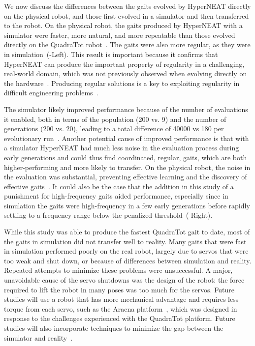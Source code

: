 We now discuss the differences between the gaits evolved by HyperNEAT directly on the physical robot, and those first evolved in a simulator and then transferred to the robot. 
On the physical robot, the gaits produced by HyperNEAT with a simulator were faster, more natural, and more repeatable than those evolved directly on the QuadraTot robot~\cite{yos:clune}. The gaits were also more regular, as they were in simulation~(-Left). This result is important because it confirms that HyperNEAT can produce the important property of
regularity in a challenging, real-world domain, which was not previously observed when
evolving directly on the hardware~\cite{yos:clune}. Producing regular solutions is a key to exploiting regularity in difficult engineering problems~\cite{clune2011performance}. 


The simulator likely improved performance because of the number of evaluations it enabled, both in terms of the population (200 vs. 9) and the number of generations (200 vs. 20), leading
to a total difference of 40000 vs 180 per evolutionary run~\cite{yos:clune}. Another
potential cause of improved performance is that with a simulator
HyperNEAT had much less noise in the evaluation process during early
generations and could thus find coordinated, regular, gaits, which are
both higher-performing and more likely to transfer. On the physical robot, the noise in the evaluation was
substantial, preventing effective learning and the discovery of
effective gaits~\cite{yos:clune}. It could also be the case that 
the addition in this study of a punishment for high-frequency gaits
aided performance, especially since in simulation the gaits were
high-frequency in a few early generations before rapidly settling to a
frequency range below the penalized threshold~(-Right).



While this study was able to produce the fastest QuadraTot gait to
date, most of the gaits in simulation did not transfer well to
reality. Many gaits that were fast in simulation performed
poorly on the real robot, largely due to servos that were too weak and
shut down, or because of differences between simulation and
reality. Repeated attempts to minimize these problems were
unsuccessful.  A major, unavoidable cause of the servo shutdowns was
the design of the robot: the force required to lift the robot in many
poses was too much for the servos. Future studies will use a
robot that has more mechanical advantage and requires less torque from
each servo, such as the Aracna platform~\cite{lohmann2012aracna},
which was designed in response to the challenges experienced with the
QuadraTot platform. Future studies will also incorporate techniques to minimize the gap between the simulator and reality~\cite{koos2010crossing,bongard,zagal}.











